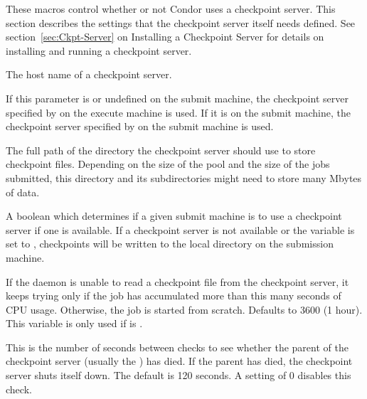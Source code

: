These macros control whether or not Condor uses a checkpoint server.
This section
describes the settings that the checkpoint server itself needs defined. 
See section~\ref{sec:Ckpt-Server} on Installing a Checkpoint Server
for details on installing and running a checkpoint server.

\begin{description}
  
\label{param:CkptServerHost}
\item[\Macro{CKPT\_SERVER\_HOST}]
  The host name of a checkpoint server.

\label{param:StarterChoosesCkptServer}
\item[\Macro{STARTER\_CHOOSES\_CKPT\_SERVER}]
  If this parameter is  or undefined on
  the submit machine, the checkpoint server specified by
   on the execute machine is used.  If it is
   on the submit machine, the checkpoint server
  specified by  on the submit machine is
  used.
  
\label{param:CkptServerDir}
\item[\Macro{CKPT\_SERVER\_DIR}]
  The full path of the
  directory the checkpoint server should use to store checkpoint files.
  Depending on the size of the pool and the size of the jobs submitted,
  this directory and its subdirectories might
  need to store many Mbytes of data.

\label{param:UseCkptServer}
\item[\Macro{USE\_CKPT\_SERVER}]
  A boolean which determines if a given submit machine is to use a
  checkpoint server if one is available.  If a
  checkpoint server is not available or the variable 
  is set to ,
  checkpoints will be written to the local  directory on
  the submission machine.

\label{param:MaxDiscardedRunTime}
\item[\Macro{MAX\_DISCARDED\_RUN\_TIME}]
  If the  daemon is unable to read a
  checkpoint file from the checkpoint server, it keeps trying only if
  the job has accumulated more than this many seconds of CPU usage.
  Otherwise, the job is started from scratch.  
  Defaults to 3600 (1 hour). 
  This variable is only used if  is .

\label{param:CkptServerCheckParentInterval}
\item[\Macro{CKPT\_SERVER\_CHECK\_PARENT\_INTERVAL}]
  This is the number of seconds between checks to see whether the parent
  of the checkpoint server (usually the ) has died.  If the
  parent has died, the checkpoint server shuts itself down.
  The default is 120 seconds.
  A setting of 0 disables this check.


\end{description}
